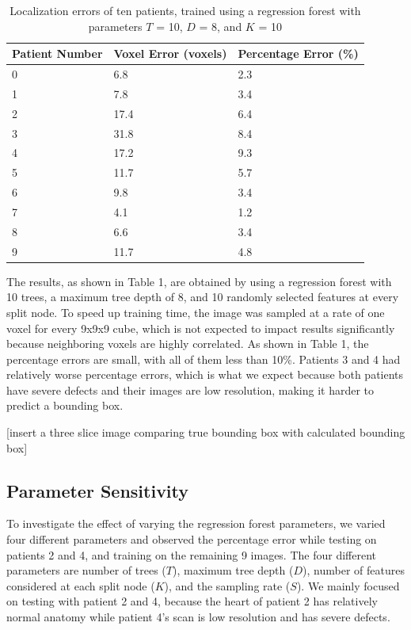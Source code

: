 \begin{table}
  \caption{Localization errors of ten patients, trained using a regression forest with parameters $T$ = 10, $D$ = 8, and $K$ = 10}
  \label{tab:err}
  \begin{tabular}{p{2cm}p{2cm}p{2cm}}
    \toprule
    Patient Number & Voxel Error (voxels) & Percentage Error (\%) \\
    \midrule
    0 & 6.8 & 2.3\\
    1 & 7.8 & 3.4\\
    2 & 17.4 & 6.4\\
    3 & 31.8 & 8.4\\
    4 & 17.2 & 9.3\\
    5 & 11.7 & 5.7\\
    6 & 9.8 & 3.4\\
    7 & 4.1 & 1.2\\
    8 & 6.6 & 3.4\\
    9 & 11.7 & 4.8\\
    \bottomrule
  \end{tabular}
\end{table}

The results, as shown in Table 1, are obtained by using a regression forest with 10 trees, a maximum tree depth of 8, and 10 randomly selected features at every split node. To speed up training time, the image was sampled at a rate of one voxel for every 9x9x9 cube, which is not expected to impact results significantly because neighboring voxels are highly correlated. As shown in Table 1, the percentage errors are small, with all of them less than 10\%. Patients 3 and 4 had relatively worse percentage errors, which is what we expect because both patients have severe defects and their images are low resolution, making it harder to predict a bounding box.

[insert a three slice image comparing true bounding box with calculated bounding box]

\subsection{Parameter Sensitivity}

To investigate the effect of varying the regression forest parameters, we varied four different parameters and observed the percentage error while testing on patients 2 and 4, and training on the remaining 9 images. The four different parameters are number of trees ($T$), maximum tree depth ($D$), number of features considered at each split node ($K$), and the sampling rate ($S$). We mainly focused on testing with patient 2 and 4, because the heart of patient 2 has relatively normal anatomy while patient 4's scan is low resolution and has severe defects.
